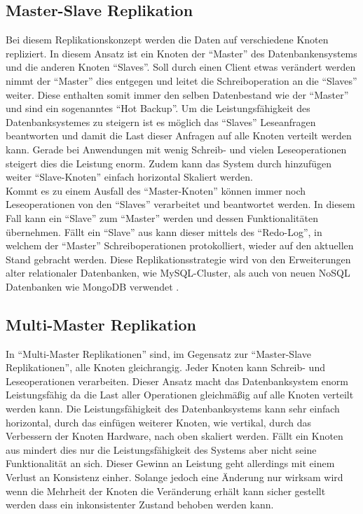 \documentclass[a4paper,11pt,oneside,%
headsepline,												%
footsepline,												%
bibtotocnumbered									%
]{scrreprt}
\begin{document}
\subsection{Master-Slave Replikation}
Bei diesem Replikationskonzept werden die Daten auf verschiedene Knoten repliziert. In diesem Ansatz ist ein Knoten der \enquote{Master} des Datenbankensystems und die anderen Knoten \enquote{Slaves}. Soll durch einen Client etwas verändert werden nimmt der \enquote{Master} dies entgegen und leitet die Schreiboperation an die \enquote{Slaves} weiter. Diese enthalten somit immer den selben Datenbestand wie der \enquote{Master} und sind ein sogenanntes \enquote{Hot Backup}. Um die Leistungsfähigkeit des Datenbanksystemes zu steigern ist es möglich das \enquote{Slaves} Leseanfragen beantworten und damit die Last dieser Anfragen auf alle Knoten verteilt werden kann. Gerade bei Anwendungen mit wenig Schreib- und vielen Leseoperationen steigert dies die Leistung enorm. Zudem kann das System durch hinzufügen weiter \enquote{Slave-Knoten} einfach horizontal Skaliert werden.\\

Kommt es zu einem Ausfall des \enquote{Master-Knoten} können immer noch Leseoperationen von den \enquote{Slaves} verarbeitet und beantwortet werden. In diesem Fall kann ein \enquote{Slave} zum \enquote{Master} werden und dessen Funktionalitäten übernehmen. Fällt ein \enquote{Slave} aus kann dieser mittels des \enquote{Redo-Log}, in welchem der \enquote{Master} Schreiboperationen protokolliert, wieder auf den aktuellen Stand gebracht werden. Diese Replikationsstrategie wird von den Erweiterungen alter relationaler Datenbanken, wie MySQL-Cluster, als auch von neuen NoSQL Datenbanken wie MongoDB verwendet \autocite[40]{Fowler2013}.

\subsection{Multi-Master Replikation}
In \enquote{Multi-Master Replikationen} sind, im Gegensatz zur \enquote{Master-Slave Replikationen}, alle Knoten gleichrangig. Jeder Knoten kann Schreib- und Leseoperationen verarbeiten. Dieser Ansatz macht das Datenbanksystem enorm Leistungsfähig da die Last aller Operationen gleichmäßig auf alle Knoten verteilt werden kann. Die Leistungsfähigkeit des Datenbanksystems kann sehr einfach horizontal, durch das einfügen weiterer Knoten, wie vertikal, durch das Verbessern der Knoten Hardware, nach oben skaliert werden. Fällt ein Knoten aus mindert dies nur die Leistungsfähigkeit des Systems aber nicht seine Funktionalität an sich. Dieser Gewinn an Leistung geht allerdings mit einem Verlust an Konsistenz einher. Solange jedoch eine Änderung nur wirksam wird wenn die Mehrheit der Knoten die Veränderung erhält kann sicher gestellt werden dass ein inkonsistenter Zustand behoben werden kann\autocite[42]{Fowler2013}.
\end{document}
